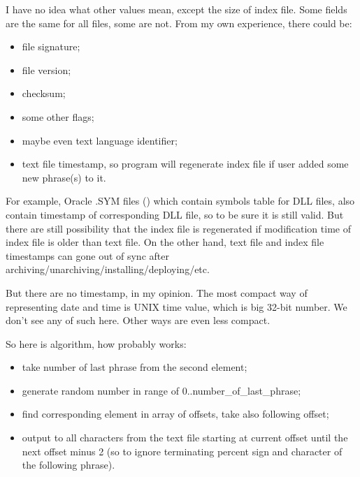 \begin{figure}[H]
\centering
{}
\end{figure}

I have no idea what other values mean, except the size of index file.
Some fields are the same for all files, some are not.
From my own experience, there could be:

\begin{itemize}
\item file signature;
\item file version;
\item checksum;
\item some other flags;
\item maybe even text language identifier;
\item text file timestamp, so  program will regenerate index file if user added some new phrase(s) to it.
\end{itemize}

For example, Oracle .SYM files () which contain symbols table for DLL files, also contain timestamp of corresponding DLL file, so to be sure it is still valid.
But there are still possibility that the index file is regenerated if modification time of index file is older than text file.
On the other hand, text file and index file timestamps can gone out of sync after archiving/unarchiving/installing/deploying/etc.

But there are no timestamp, in my opinion. The most compact way of representing date and time is UNIX time value, which is big 32-bit number. We don't see any of such here. Other ways are even less compact.

So here is algorithm, how  probably works:

\begin{itemize}
\item take number of last phrase from the second element;
\item generate random number in range of 0..number\_of\_last\_phrase;
\item find corresponding element in array of offsets, take also following offset;
\item output to  all characters from the text file starting at current offset until
the next offset minus 2 (so to ignore terminating percent sign 
and character of the following phrase).
\end{itemize}

